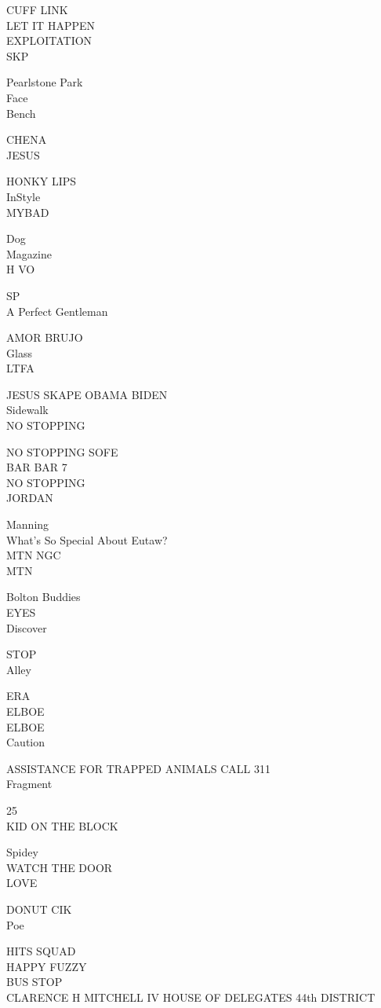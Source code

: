 \documentclass[10pt,letterpaper]{article}
\begin{document}
CUFF LINK\\
LET IT HAPPEN\\
EXPLOITATION\\
SKP

Pearlstone Park\\
Face\\
Bench

CHENA\\
JESUS

HONKY LIPS\\
InStyle\\
MYBAD

Dog\\
Magazine\\
H VO

SP\\
A Perfect Gentleman

AMOR BRUJO\\
Glass\\
LTFA

JESUS SKAPE OBAMA BIDEN\\
Sidewalk\\
NO STOPPING

NO STOPPING SOFE\\
BAR BAR 7\\
NO STOPPING\\
JORDAN

Manning\\
What's So Special About Eutaw?\\
MTN NGC\\
MTN

Bolton Buddies\\
EYES\\
Discover

STOP\\
Alley

ERA\\
ELBOE\\
ELBOE\\
Caution

ASSISTANCE FOR TRAPPED ANIMALS CALL 311\\
Fragment

25\\
KID ON THE BLOCK

Spidey\\
WATCH THE DOOR\\
LOVE

DONUT CIK\\
Poe

HITS SQUAD\\
HAPPY FUZZY\\
BUS STOP\\
CLARENCE H MITCHELL IV HOUSE OF DELEGATES 44th DISTRICT
\end{document}
